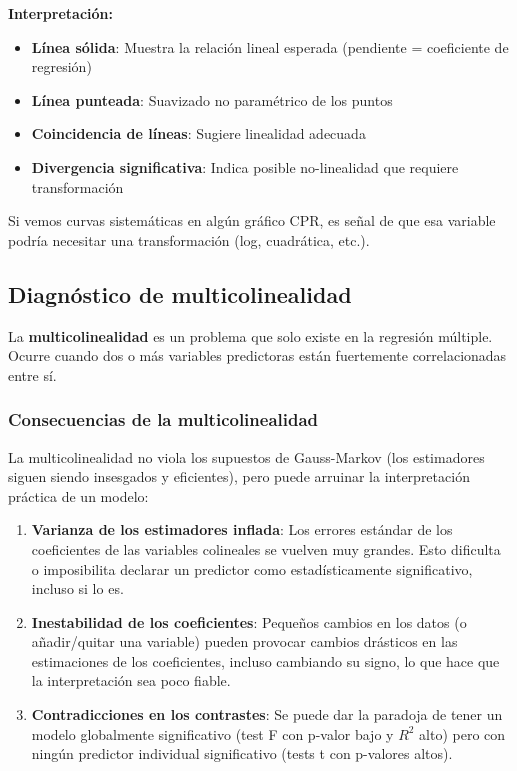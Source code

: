 \documentclass[
  letterpaper,
  DIV=11,
  numbers=noendperiod]{scrreprt}
\providecommand{\tightlist}{%
  \setlength{\itemsep}{0pt}\setlength{\parskip}{0pt}}
\begin{document}
\begin{tcolorbox}
\textbf{Interpretación:}

\begin{itemize}
\tightlist
\item
  \textbf{Línea sólida}: Muestra la relación lineal esperada (pendiente
  = coeficiente de regresión)
\item
  \textbf{Línea punteada}: Suavizado no paramétrico de los puntos
\item
  \textbf{Coincidencia de líneas}: Sugiere linealidad adecuada
\item
  \textbf{Divergencia significativa}: Indica posible no-linealidad que
  requiere transformación
\end{itemize}

Si vemos curvas sistemáticas en algún gráfico CPR, es señal de que esa
variable podría necesitar una transformación (log, cuadrática, etc.).

\end{tcolorbox}

\subsection{Diagnóstico de
multicolinealidad}\label{diagnuxf3stico-de-multicolinealidad}

La \textbf{multicolinealidad} es un problema que solo existe en la
regresión múltiple. Ocurre cuando dos o más variables predictoras están
fuertemente correlacionadas entre sí.

\subsubsection{Consecuencias de la
multicolinealidad}\label{consecuencias-de-la-multicolinealidad}

La multicolinealidad no viola los supuestos de Gauss-Markov (los
estimadores siguen siendo insesgados y eficientes), pero puede arruinar
la interpretación práctica de un modelo:

\begin{enumerate}
\def\labelenumi{\arabic{enumi}.}
\tightlist
\item
  \textbf{Varianza de los estimadores inflada}: Los errores estándar de
  los coeficientes de las variables colineales se vuelven muy grandes.
  Esto dificulta o imposibilita declarar un predictor como
  estadísticamente significativo, incluso si lo es.
\item
  \textbf{Inestabilidad de los coeficientes}: Pequeños cambios en los
  datos (o añadir/quitar una variable) pueden provocar cambios drásticos
  en las estimaciones de los coeficientes, incluso cambiando su signo,
  lo que hace que la interpretación sea poco fiable.
\item
  \textbf{Contradicciones en los contrastes}: Se puede dar la paradoja
  de tener un modelo globalmente significativo (test F con p-valor bajo
  y \(R^2\) alto) pero con ningún predictor individual significativo
  (tests t con p-valores altos).
\end{enumerate}
\end{document}
